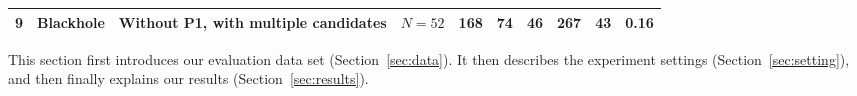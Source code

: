 \begin{table*}[htb]
\begin{tabular}{l|l|p{2.8cm}|p{2.2cm}| r| r| r| r| r|r}
			
			
			9 & Blackhole & Without P1, with multiple candidates &$N=52$ &168& 74& 46 &267 & 43 & 0.16\\
			\bottomrule
		\end{tabular}
	
	\end{table*}

This section first introduces our evaluation data set (Section~\ref{sec:data}). It then describes the experiment settings (Section~\ref{sec:setting}), and then finally explains our results (Section~\ref{sec:results}).  

